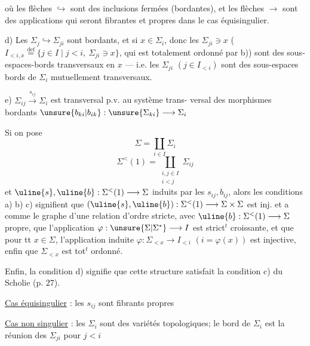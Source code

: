 où les flèches $\hookrightarrow$ sont des inclusions
fermées  (bordantes), et les flèches $\longrightarrow$
sont des applications qui seront fibrantes et propres
dans le cas équisingulier.

d)  Les $\Sigma_j\hookrightarrow\Sigma_{ji}$ sont bordants, et si
$x\in\Sigma_i$,  donc les $\Sigma_{ji}\ni x$ (
\deleted{$\unsure{\Sigma}$} $I_{<i,x}\overset{\mathrm{def}}{=}\{j\in I\mid j<i,\ \Sigma_{ji}\ni x\}$,
qui est totalement ordonné par b)) sont
des sous-espaces-bords transversaux en $x$
--- i.e. les $\Sigma_{ji}$ $(j\in I_{<i})$ sont des
sous-espaces bords de $\Sigma_i$ mutuellement
transversaux.

e) $\Sigma_{ij}\xrightarrow{s_{ij}}\Sigma_i$ est transversal p.v. au système trans-
versal des morphismes bordants
$\unsure{b_{ki}|b_{ik}}:\unsure{\Sigma_{ki}}\longrightarrow\Sigma_i$

Si on pose
\[
\Sigma=\coprod_{i\in I}\Sigma_i
\]
\[
\Sigma^{<}(1)=\coprod_{\substack{i,j\in I\\i<j}}\Sigma_{ij}
\]
et $\uline{s},\uline{b}:\Sigma^{<}(1)\longrightarrow\Sigma$ induits par les
$s_{ij},b_{ij}$, alors les conditions a) b) c)
signifient que $(\uline{s},\uline{b}):\Sigma^{<}(1)\longrightarrow\Sigma\times\Sigma$ est
inj. et a comme  le graphe d'une
relation d'ordre stricte, avec $\uline{b}:\Sigma^{<}(1)\longrightarrow\Sigma$
 propre,  que l'application  $\varphi:\unsure{\Sigma|\Sigma^{*}}\longrightarrow I$
est strict${}^t$ croissante, et que pour tt $x\in\Sigma$,
l'application induite $\varphi:\Sigma_{<x}\longrightarrow I_{<i}$ $(i=\varphi(x))$ est
injective, enfin que $\Sigma_{<x}$ est tot${}^t$ ordonné.

Enfin, la condition d) signifie que cette structure
satisfait la condition c) du Scholie (p. $27$).

\uline{Cas équisingulier} : les $s_{ij}$ sont fibrants propres

\uline{Cas non singulier} : les $\Sigma_i$ sont des variétés
topologiques; le bord de $\Sigma_i$ est la réunion
des $\Sigma_{ji}$ pour $j<i$ 

